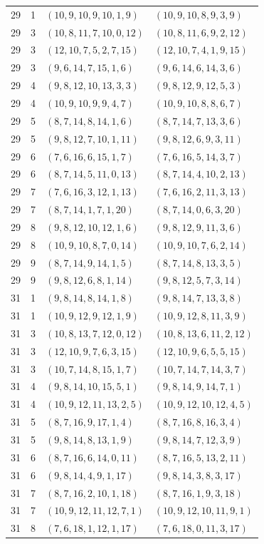 \documentclass[11pt,a4paper]{article}
\theoremstyle{definition}
\numberwithin{equation}{section}
\begin{document}
\begin{longtable}{rrll}
29&1&$(10,9,10,9,10,1,9)$&$(10,9,10,8,9,3,9)$\\
29&3&$(10,8,11,7,10,0,12)$&$(10,8,11,6,9,2,12)$\\
29&3&$(12,10,7,5,2,7,15)$&$(12,10,7,4,1,9,15)$\\
29&3&$(9,6,14,7,15,1,6)$&$(9,6,14,6,14,3,6)$\\
29&4&$(9,8,12,10,13,3,3)$&$(9,8,12,9,12,5,3)$\\
29&4&$(10,9,10,9,9,4,7)$&$(10,9,10,8,8,6,7)$\\
29&5&$(8,7,14,8,14,1,6)$&$(8,7,14,7,13,3,6)$\\
29&5&$(9,8,12,7,10,1,11)$&$(9,8,12,6,9,3,11)$\\
29&6&$(7,6,16,6,15,1,7)$&$(7,6,16,5,14,3,7)$\\
29&6&$(8,7,14,5,11,0,13)$&$(8,7,14,4,10,2,13)$\\
29&7&$(7,6,16,3,12,1,13)$&$(7,6,16,2,11,3,13)$\\
29&7&$(8,7,14,1,7,1,20)$&$(8,7,14,0,6,3,20)$\\
29&8&$(9,8,12,10,12,1,6)$&$(9,8,12,9,11,3,6)$\\
29&8&$(10,9,10,8,7,0,14)$&$(10,9,10,7,6,2,14)$\\
29&9&$(8,7,14,9,14,1,5)$&$(8,7,14,8,13,3,5)$\\
29&9&$(9,8,12,6,8,1,14)$&$(9,8,12,5,7,3,14)$\\
31&1&$(9,8,14,8,14,1,8)$&$(9,8,14,7,13,3,8)$\\
31&1&$(10,9,12,9,12,1,9)$&$(10,9,12,8,11,3,9)$\\
31&3&$(10,8,13,7,12,0,12)$&$(10,8,13,6,11,2,12)$\\
31&3&$(12,10,9,7,6,3,15)$&$(12,10,9,6,5,5,15)$\\
31&3&$(10,7,14,8,15,1,7)$&$(10,7,14,7,14,3,7)$\\
31&4&$(9,8,14,10,15,5,1)$&$(9,8,14,9,14,7,1)$\\
31&4&$(10,9,12,11,13,2,5)$&$(10,9,12,10,12,4,5)$\\
31&5&$(8,7,16,9,17,1,4)$&$(8,7,16,8,16,3,4)$\\
31&5&$(9,8,14,8,13,1,9)$&$(9,8,14,7,12,3,9)$\\
31&6&$(8,7,16,6,14,0,11)$&$(8,7,16,5,13,2,11)$\\
31&6&$(9,8,14,4,9,1,17)$&$(9,8,14,3,8,3,17)$\\
31&7&$(8,7,16,2,10,1,18)$&$(8,7,16,1,9,3,18)$\\
31&7&$(10,9,12,11,12,7,1)$&$(10,9,12,10,11,9,1)$\\
31&8&$(7,6,18,1,12,1,17)$&$(7,6,18,0,11,3,17)$\\

\end{longtable}
\end{document}
